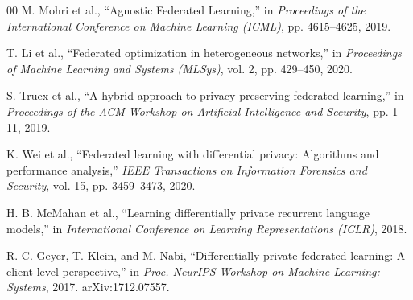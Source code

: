 \documentclass[conference]{IEEEtran}
\begin{document}
\begin{thebibliography}{00}
 M. Mohri et al., ``Agnostic Federated Learning,'' in \textit{Proceedings of the International Conference on Machine Learning (ICML)}, pp. 4615--4625, 2019.

 T. Li et al., ``Federated optimization in heterogeneous networks,'' in \textit{Proceedings of Machine Learning and Systems (MLSys)}, vol. 2, pp. 429--450, 2020.

 S. Truex et al., ``A hybrid approach to privacy-preserving federated learning,'' in \textit{Proceedings of the ACM Workshop on Artificial Intelligence and Security}, pp. 1--11, 2019.

 K. Wei et al., ``Federated learning with differential privacy: Algorithms and performance analysis,'' \textit{IEEE Transactions on Information Forensics and Security}, vol. 15, pp. 3459--3473, 2020.

 H. B. McMahan et al., ``Learning differentially private recurrent language models,'' in \textit{International Conference on Learning Representations (ICLR)}, 2018.

 R. C. Geyer, T. Klein, and M. Nabi, ``Differentially private federated learning: A client level perspective,'' in \textit{Proc. NeurIPS Workshop on Machine Learning: Systems}, 2017. arXiv:1712.07557.

\end{thebibliography}
\end{document}
